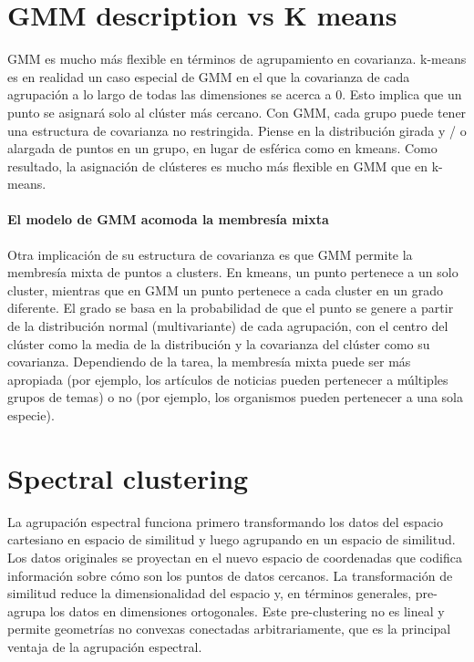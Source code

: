 \documentclass[11pt]{article}
\begin{document}
\section{GMM description vs K means}\label{gmm-description-vs-k-means}

GMM es mucho más flexible en términos de agrupamiento en covarianza.
k-means es en realidad un caso especial de GMM en el que la covarianza
de cada agrupación a lo largo de todas las dimensiones se acerca a 0.
Esto implica que un punto se asignará solo al clúster más cercano. Con
GMM, cada grupo puede tener una estructura de covarianza no restringida.
Piense en la distribución girada y / o alargada de puntos en un grupo,
en lugar de esférica como en kmeans. Como resultado, la asignación de
clústeres es mucho más flexible en GMM que en k-means.

\paragraph{El modelo de GMM acomoda la membresía
mixta}\label{el-modelo-de-gmm-acomoda-la-membresuxeda-mixta}

Otra implicación de su estructura de covarianza es que GMM permite la
membresía mixta de puntos a clusters. En kmeans, un punto pertenece a un
solo cluster, mientras que en GMM un punto pertenece a cada cluster en
un grado diferente. El grado se basa en la probabilidad de que el punto
se genere a partir de la distribución normal (multivariante) de cada
agrupación, con el centro del clúster como la media de la distribución y
la covarianza del clúster como su covarianza. Dependiendo de la tarea,
la membresía mixta puede ser más apropiada (por ejemplo, los artículos
de noticias pueden pertenecer a múltiples grupos de temas) o no (por
ejemplo, los organismos pueden pertenecer a una sola especie).

    \section{Spectral clustering}\label{spectral-clustering}

La agrupación espectral funciona primero transformando los datos del
espacio cartesiano en espacio de similitud y luego agrupando en un
espacio de similitud. Los datos originales se proyectan en el nuevo
espacio de coordenadas que codifica información sobre cómo son los
puntos de datos cercanos. La transformación de similitud reduce la
dimensionalidad del espacio y, en términos generales, pre-agrupa los
datos en dimensiones ortogonales. Este pre-clustering no es lineal y
permite geometrías no convexas conectadas arbitrariamente, que es la
principal ventaja de la agrupación espectral.
\end{document}
